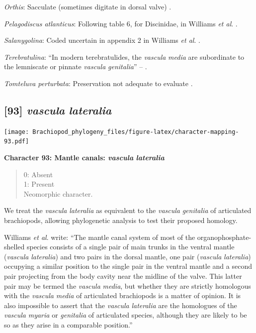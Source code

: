\documentclass[openany]{book}
\theoremstyle{definition}
\theoremstyle{definition}
\theoremstyle{definition}
\theoremstyle{remark}
\begin{document}
\hypertarget{Orthis-coding-92}{}
\emph{Orthis}: Sacculate (sometimes digitate in dorsal valve)
\citep[p716]{Williams2000LinguliformeaCraniiformea}.

\hypertarget{Pelagodiscus_atlanticus-coding-92}{}
\emph{Pelagodiscus atlanticus}: Following table 6, for Discinidae, in
Williams \emph{et al}.
\citeyearpar{Williams2000LinguliformeaCraniiformea}.

\hypertarget{Salanygolina-coding-92}{}
\emph{Salanygolina}: Coded uncertain in appendix 2 in Williams \emph{et
al}. \citeyearpar{Williams1998Thediversity}.

\hypertarget{Terebratulina-coding-92}{}
\emph{Terebratulina}: ``In modern terebratulides, the \emph{vascula}
\emph{media} are subordinate to the lemniscate or pinnate \emph{vascula}
\emph{genitalia}'' -- \citet{Williams1997Introduction}.

\hypertarget{Tomteluva_perturbata-coding-92}{}
\emph{Tomteluva perturbata}: Preservation not adequate to evaluate
\citep{Streng2016Anew}.

\subsection*{\texorpdfstring{{[}93{]} \emph{vascula}
\emph{lateralia}}{{[}93{]} vascula lateralia}}\label{vascula-lateralia}

\texttt{[image: Brachiopod\_phylogeny\_files/figure-latex/character-mapping-93.pdf]}

\textbf{Character 93: Mantle canals: \emph{vascula} \emph{lateralia}}

\begin{quote}
0: Absent\\
1: Present\\
Neomorphic character.
\end{quote}

We treat the \emph{vascula} \emph{lateralia} as equivalent to the
\emph{vascula} \emph{genitalia} of articulated brachiopods, allowing
phylogenetic analysis to test their proposed homology.

Williams \emph{et al}. \citeyearpar{Williams1997Introduction} write:
``The mantle canal system of most of the organophosphate-shelled species
consists of a single pair of main trunks in the ventral mantle
(\emph{vascula} \emph{lateralia}) and two pairs in the dorsal mantle,
one pair (\emph{vascula} \emph{lateralia}) occupying a similar position
to the single pair in the ventral mantle and a second pair projecting
from the body cavity near the midline of the valve. This latter pair may
be termed the \emph{vascula} \emph{media}, but whether they are strictly
homologous with the \emph{vascula} \emph{media} of articulated
brachiopods is a matter of opinion. It is also impossible to assert that
the \emph{vascula} \emph{lateralia} are the homologues of the
\emph{vascula} \emph{myaria} or \emph{genitalia} of articulated species,
although they are likely to be so as they arise in a comparable
position.''
\end{document}
